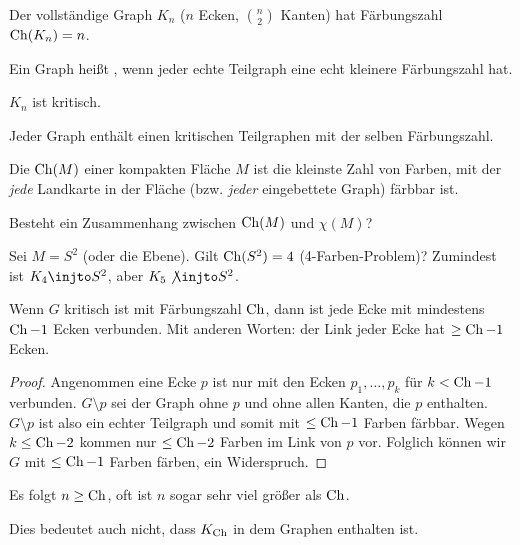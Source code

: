 \begin{ex}
    Der vollständige Graph $K_n$ ($n$ Ecken, $\binom{n}{2}$ Kanten) hat Färbungszahl $\operatorname { Ch }(K_n) = n$.
\end{ex}

\begin{df}
    Ein Graph heißt , wenn jeder echte Teilgraph eine echt kleinere Färbungszahl hat.
\end{df}

\begin{ex}
    $K_n$ ist kritisch.
\end{ex}

\begin{kor}
    Jeder Graph enthält einen kritischen Teilgraphen mit der selben Färbungszahl.
\end{kor}

\begin{df}
    Die  $\operatorname { Ch }(M)$ einer kompakten Fläche $M$ ist die kleinste Zahl von Farben, mit der \emph{jede} Landkarte in der Fläche (bzw. \emph{jeder} eingebettete Graph) färbbar ist.
\end{df}

Besteht ein Zusammenhang zwischen $\operatorname { Ch }(M)$ und $\chi(M)$?

Sei $M = S^2$ (oder die Ebene).
Gilt $\operatorname { Ch }(S^2) = 4$ (4-Farben-Problem)? 
Zumindest ist $K_4 \injto S^2$, aber $K_5 \not\injto S^2$.

\begin{st}
    Wenn $G$ kritisch ist mit Färbungszahl $\operatorname { Ch }$, dann ist jede Ecke mit mindestens $\operatorname { Ch } - 1$ Ecken verbunden.
    Mit anderen Worten: der Link jeder Ecke hat $\ge \operatorname { Ch } - 1$ Ecken.
    \begin{proof}
        Angenommen eine Ecke $p$ ist nur mit den Ecken $p_1, \dotsc, p_k$ für $k < \operatorname { Ch } - 1$ verbunden.
        $G \setminus p$ sei der Graph ohne $p$ und ohne allen Kanten, die $p$ enthalten.
        $G \setminus p$ ist also ein echter Teilgraph und somit mit $\le \operatorname { Ch } - 1$ Farben färbbar.
        Wegen $k \le \operatorname { Ch } - 2$ kommen nur $\le \operatorname { Ch } - 2$ Farben im Link von $p$ vor.
        Folglich können wir $G$ mit $\le \operatorname { Ch } - 1$ Farben färben, ein Widerspruch.
    \end{proof}
    \begin{note}
        Es folgt $n \ge \operatorname { Ch }$, oft ist $n$ sogar sehr viel größer als $\operatorname { Ch }$.

        Dies bedeutet auch nicht, dass $K_{\operatorname { Ch }}$ in dem Graphen enthalten ist.
    \end{note}
\end{st}

